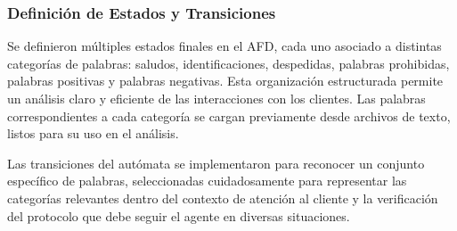 \subsubsection{Definición de Estados y Transiciones}

Se definieron múltiples estados finales en el AFD, cada uno asociado a distintas categorías de
palabras: saludos, identificaciones, despedidas, palabras prohibidas, palabras positivas y
palabras negativas. Esta organización estructurada permite un análisis claro y eficiente de las
interacciones con los clientes. Las palabras correspondientes a cada categoría se cargan
previamente desde archivos de texto, listos para su uso en el análisis.

Las transiciones del autómata se implementaron para reconocer un conjunto específico de
palabras, seleccionadas cuidadosamente para representar las categorías relevantes dentro del
contexto de atención al cliente y la verificación del protocolo que debe seguir el agente en
diversas situaciones.
